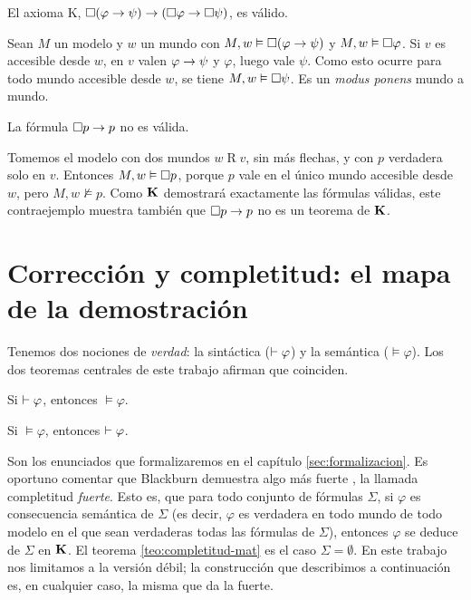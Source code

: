 \begin{ejemplo}\label{ej:k-valido}
El axioma K, $\square(\varphi \to \psi) \to (\square\varphi \to \square\psi)$, es válido.

Sean $M$ un modelo y $w$ un mundo con $M, w \vDash \square(\varphi \to \psi)$ y $M, w \vDash \square\varphi$. Si $v$ es accesible desde $w$, en $v$ valen $\varphi \to \psi$ y $\varphi$, luego vale $\psi$. Como esto ocurre para todo mundo accesible desde $w$, se tiene $M, w \vDash \square\psi$. Es un \emph{modus ponens} mundo a mundo.
\end{ejemplo}

\begin{ejemplo}\label{ej:box-p-imp-p}
La fórmula $\square p \to p$ no es válida.

Tomemos el modelo con dos mundos $w \mathrel{R} v$, sin más flechas, y con $p$ verdadera solo en $v$. Entonces $M, w \vDash \square p$, porque $p$ vale en el único mundo accesible desde $w$, pero $M, w \nvDash p$. Como $\mathbf{K}$ demostrará exactamente las fórmulas válidas, este contraejemplo muestra también que $\square p \to p$ no es un teorema de $\mathbf{K}$.
\end{ejemplo}

\section{Corrección y completitud: el mapa de la demostración}
\label{sec:mapa-completitud}

Tenemos dos nociones de \emph{verdad}: la sintáctica ($\vdash \varphi$) y la semántica ($\vDash \varphi$). Los dos teoremas centrales de este trabajo afirman que coinciden.

\begin{teorema}\label{teo:correccion-mat}
Si $\vdash \varphi$, entonces $\vDash \varphi$.
\end{teorema}

\begin{teorema}\label{teo:completitud-mat}
Si $\vDash \varphi$, entonces $\vdash \varphi$.
\end{teorema}

Son los enunciados que formalizaremos en el capítulo \ref{sec:formalizacion}. Es oportuno comentar que Blackburn demuestra algo más fuerte \cite[Teorema~4.23]{blackburn}, la llamada completitud \emph{fuerte}. Esto es, que para todo conjunto de fórmulas $\Sigma$, si $\varphi$ es consecuencia semántica de $\Sigma$ (es decir, $\varphi$ es verdadera en todo mundo de todo modelo en el que sean verdaderas todas las fórmulas de $\Sigma$), entonces $\varphi$ se deduce de $\Sigma$ en $\mathbf{K}$. El teorema \ref{teo:completitud-mat} es el caso $\Sigma = \emptyset$. En este trabajo nos limitamos a la versión débil; la construcción que describimos a continuación es, en cualquier caso, la misma que da la fuerte.

